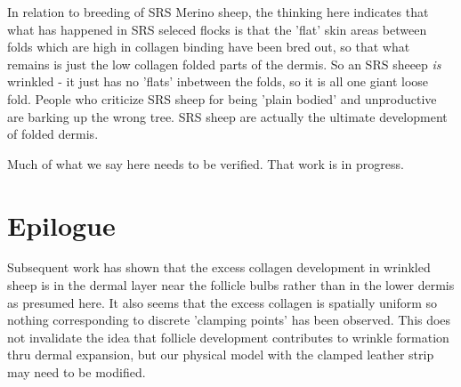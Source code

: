 \documentclass[titlepage]{article}  %
\begin{document}
In relation to breeding of SRS Merino sheep, the thinking here indicates that what has happened in SRS seleced flocks is that the 'flat' skin areas between folds which are high in collagen binding have been bred out, so that what remains is just the low collagen folded parts of the dermis. So an SRS sheeep {\em is} wrinkled - it just has no 'flats' inbetween the folds, so it is all one giant loose fold. People who criticize SRS sheep for being 'plain bodied' and unproductive are barking up the wrong tree. SRS sheep are actually the ultimate development of folded dermis. 

Much of what we say here needs to be verified. That work is in progress.

\section{Epilogue}
Subsequent work has shown that the excess collagen development in wrinkled sheep is in the dermal layer near the follicle bulbs rather than in the lower dermis as presumed here. It also seems that the excess collagen is spatially uniform so nothing corresponding to discrete 'clamping points' has been observed. This does not invalidate the idea that follicle development contributes to wrinkle formation thru dermal expansion, but our physical model with the clamped leather strip may need to be modified.
\end{document}
